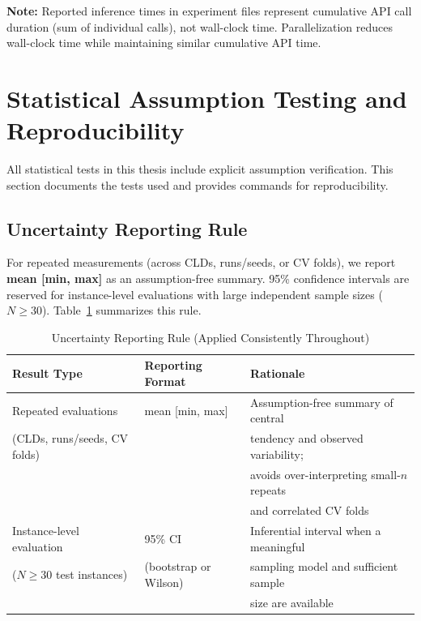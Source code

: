 \textbf{Note:} Reported inference times in experiment files represent cumulative API call duration (sum of individual calls), not wall-clock time. Parallelization reduces wall-clock time while maintaining similar cumulative API time.

\section{Statistical Assumption Testing and Reproducibility}
\label{sec:assumption_testing}

All statistical tests in this thesis include explicit assumption verification. This section documents the tests used and provides commands for reproducibility.

\subsection{Uncertainty Reporting Rule}
\label{sec:uncertainty_rule}

For repeated measurements (across CLDs, runs/seeds, or CV folds), we report \textbf{mean [min, max]} as an assumption-free summary. 95\% confidence intervals are reserved for instance-level evaluations with large independent sample sizes ($N \geq 30$). Table~\ref{tab:uncertainty_rule} summarizes this rule.

\begin{table}[H]
\centering
\caption{Uncertainty Reporting Rule (Applied Consistently Throughout)}
\label{tab:uncertainty_rule}
\footnotesize
\begin{tabular}{@{}l l l@{}}
\toprule
\textbf{Result Type} & \textbf{Reporting Format} & \textbf{Rationale} \\
\midrule
Repeated evaluations & mean [min, max] & Assumption-free summary of central \\
(CLDs, runs/seeds, CV folds) & & tendency and observed variability; \\
 & & avoids over-interpreting small-$n$ repeats \\
 & & and correlated CV folds \\
\midrule
Instance-level evaluation & 95\% CI & Inferential interval when a meaningful \\
($N \geq 30$ test instances) & (bootstrap or Wilson) & sampling model and sufficient sample \\
 & & size are available \\
\bottomrule
\end{tabular}
\end{table}

